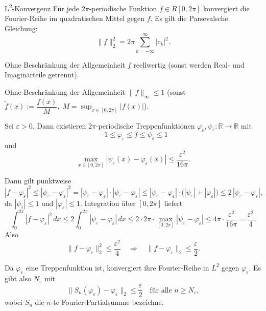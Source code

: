 \begin{satz}{L\textsuperscript{2}-Konvergenz}
    Für jede $2\pi$-periodische Funktion $f \in R[0,2\pi]$ konvergiert die
    Fourier-Reihe im quadratischen Mittel gegen $f$. Es gilt die Parsevalsche Gleichung:
    $$
        \|f\|_2^2 = 2\pi \sum_{k=-\infty}^{\infty} |c_k|^2.
    $$
\end{satz}

\begin{beweisbox}
    Ohne Beschränkung der Allgemeinheit  $f$ reellwertig (sonst werden Real- und Imaginärteile getrennt).

    Ohne Beschränkung der Allgemeinheit  $\|f\|_{\infty}\le 1$ (sonst $\tilde f(x):=\dfrac{f(x)}{M},\;M=\sup_{x\in[0,2\pi]}|f(x)|$).

    Sei $\varepsilon>0$. Dann existieren $2\pi$-periodische Treppenfunktionen $\varphi_{\varepsilon},\psi_{\varepsilon}:\mathbb{R}\to\mathbb{R}$ mit
    $$
    -1\le \varphi_{\varepsilon}\le f\le \psi_{\varepsilon}\le 1
    $$
    und
    $$
    \max_{x\in[0,2\pi]}|\psi_{\varepsilon}(x)-\varphi_{\varepsilon}(x)| \le \frac{\varepsilon^{2}}{16\pi}.
    $$

    Dann gilt punktweise
    $$
    |f-\varphi_{\varepsilon}|^{2} \le |\psi_{\varepsilon}-\varphi_{\varepsilon}|^{2}
    = |\psi_{\varepsilon}-\varphi_{\varepsilon}|\cdot|\psi_{\varepsilon}-\varphi_{\varepsilon}|
    \le |\psi_{\varepsilon}-\varphi_{\varepsilon}|\cdot\big(|\psi_{\varepsilon}|+|\varphi_{\varepsilon}|\big)
    \le 2\,|\psi_{\varepsilon}-\varphi_{\varepsilon}|,
    $$
    da $|\psi_{\varepsilon}|\le1$ und $|\varphi_{\varepsilon}|\le1$. Integration über $[0,2\pi]$ liefert
    $$
    \int_{0}^{2\pi}|f-\varphi_{\varepsilon}|^{2}\,dx
    \le 2\int_{0}^{2\pi}|\psi_{\varepsilon}-\varphi_{\varepsilon}|\,dx
    \le 2\cdot 2\pi\cdot \max_{[0,2\pi]}|\psi_{\varepsilon}-\varphi_{\varepsilon}|
    \le 4\pi\cdot\frac{\varepsilon^{2}}{16\pi}=\frac{\varepsilon^{2}}{4}.
    $$
    Also
    $$
    \|f-\varphi_{\varepsilon}\|_{2}^{2}\le \frac{\varepsilon^{2}}{4}\quad\Rightarrow\quad
    \|f-\varphi_{\varepsilon}\|_{2}\le \frac{\varepsilon}{2}.
    $$

    Da $\varphi_{\varepsilon}$ eine Treppenfunktion ist, konvergiert ihre Fourier-Reihe in $L^{2}$ gegen $\varphi_{\varepsilon}$. Es gibt also $N_{\varepsilon}$ mit
    $$
    \|S_{n}(\varphi_{\varepsilon})-\varphi_{\varepsilon}\|_{2}\le \frac{\varepsilon}{2}
    \quad\text{für alle }n\ge N_{\varepsilon},
    $$
    wobei $S_{n}$ die $n$-te Fourier-Partialsumme bezeichne.


\end{beweisbox}
